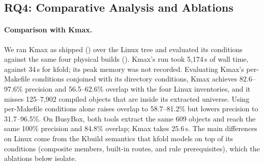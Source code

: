 \documentclass[acmsmall]{acmart}
\newcommand{\tool}{\textsf{kfold}\xspace}
\newcommand{\kmax}{\textsf{Kmax}\xspace}
\begin{document}
\subsection{RQ4: Comparative Analysis and Ablations}\label{sec:eval:comparative}

\paragraph{Comparison with \kmax.}
We ran \kmax as shipped () over the Linux tree and evaluated its conditions against the same four physical builds ().
\kmax's run took 5,174\,s of wall time, against 34\,s for \tool; its peak memory was not recorded.
Evaluating \kmax's per-Makefile conditions conjoined with its directory conditions, \kmax achieves 82.6--97.6\% precision and 56.5--62.6\% overlap with the four Linux inventories, and it misses 125--7,902 compiled objects that are inside its extracted universe.
Using per-Makefile conditions alone raises overlap to 58.7--81.2\% but lowers precision to 31.7--96.5\%.
On BusyBox, both tools extract the same 609 objects and reach the same 100\% precision and 84.8\% overlap; \kmax takes 25.6\,s.
The main differences on Linux come from the Kbuild semantics that \tool models on top of its conditions (composite members, built-in routes, and rule prerequisites), which the ablations below isolate.
\end{document}
